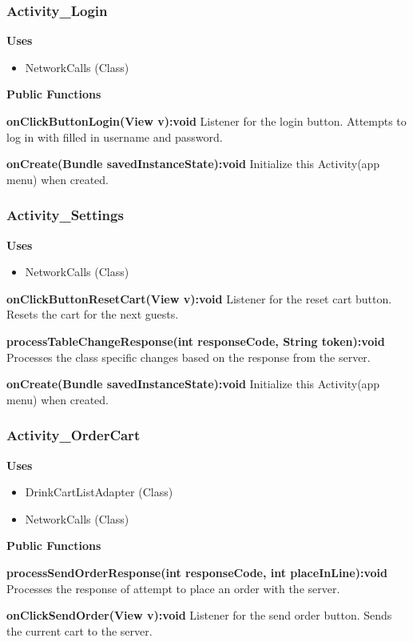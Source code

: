 \documentclass [10pt]{article}
\begin{document}
\subsubsection{Activity\_Login}

\textbf{Uses}
\begin{itemize}
	\item NetworkCalls (Class)
\end{itemize}

\textbf{Public Functions}

\textbf{onClickButtonLogin(View v):void}
Listener for the login button. Attempts to log in with filled in username and password.

\textbf{onCreate(Bundle savedInstanceState):void}
Initialize this Activity(app menu) when created.

\subsubsection{Activity\_Settings}

\textbf{Uses}
\begin{itemize}
	\item NetworkCalls (Class)
\end{itemize}

\textbf{onClickButtonResetCart(View v):void}
Listener for the reset cart button. Resets the cart for the next guests.

\textbf{processTableChangeResponse(int responseCode, String token):void}
Processes the class specific changes based on the response from the server.

\textbf{onCreate(Bundle savedInstanceState):void}
Initialize this Activity(app menu) when created.

\subsubsection{Activity\_OrderCart}

\textbf{Uses}
\begin{itemize}
	\item DrinkCartListAdapter (Class)
	\item NetworkCalls (Class)
\end{itemize}

\textbf{Public Functions}

\textbf{processSendOrderResponse(int responseCode, int placeInLine):void}
Processes the response of attempt to place an order with the server.

\textbf{onClickSendOrder(View v):void}
Listener for the send order button. Sends the current cart to the server.
\end{document}
